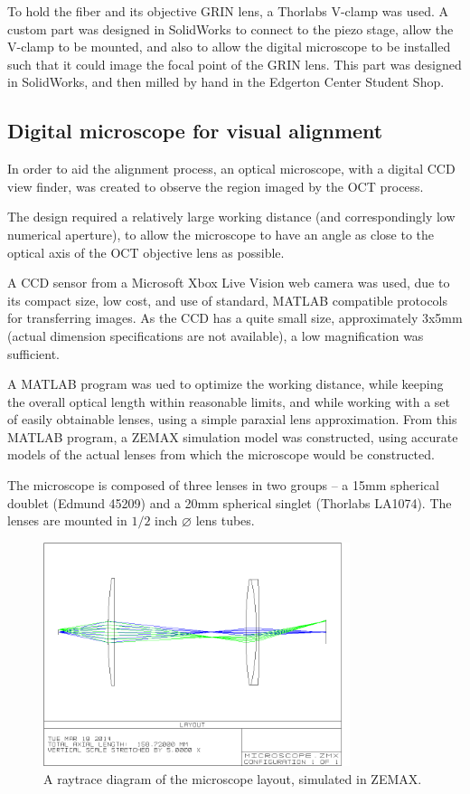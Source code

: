 To hold the fiber and its objective GRIN lens, a Thorlabs V-clamp was used. A custom part was designed in SolidWorks to connect to the piezo stage, allow the V-clamp to be mounted, and also to allow the digital microscope to be installed such that it could image the focal point of the GRIN lens. This part was designed in SolidWorks, and then milled by hand in the Edgerton Center Student Shop.

\subsection{Digital microscope for visual alignment}


In order to aid the alignment process, an optical microscope, with a digital CCD view finder, was created to observe the region imaged by the OCT process.

The design required a relatively large working distance (and correspondingly low numerical aperture), to allow the microscope to have an angle as close to the optical axis of the OCT objective lens as possible.

A CCD sensor from a Microsoft Xbox Live Vision web camera was used, due to its compact size, low cost, and use of standard, MATLAB compatible protocols for transferring images. As the CCD has a quite small size, approximately 3x5mm (actual dimension specifications are not available), a low magnification was sufficient.

A MATLAB program was ued to optimize the working distance, while keeping the overall optical length within reasonable limits, and while working with a set of easily obtainable lenses, using a simple paraxial lens approximation. From this MATLAB program, a ZEMAX simulation model was constructed, using accurate models of the actual lenses from which the microscope would be constructed.

The microscope is composed of three lenses in two groups -- a 15mm spherical doublet (Edmund 45209) and a 20mm spherical singlet (Thorlabs LA1074). The lenses are mounted in $1/2$ inch $\diameter$ lens tubes.

\begin{figure}[h!]
\centering
\includegraphics[width=0.8\textwidth]{Images/Microscope/microscope_layout_3.png}
\caption{A raytrace diagram of the microscope layout, simulated in ZEMAX.}
\end{figure}

